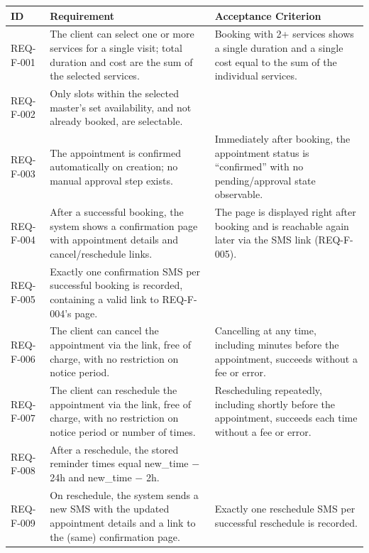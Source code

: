 \documentclass[11pt,a4paper]{article}
\begin{document}
\begin{longtable}{L{1.9cm}L{6.4cm}L{6.2cm}}
\toprule
ID & Requirement & Acceptance Criterion \\
\midrule
\endhead

REQ-F-001 &
The client can select one or more services for a single visit; total
duration and cost are the sum of the selected services. &
Booking with 2+ services shows a single duration and a single cost equal
to the sum of the individual services. \\

REQ-F-002 &
Only slots within the selected master's set availability, and not already
booked, are selectable. \\

REQ-F-003 &
The appointment is confirmed automatically on creation; no manual
approval step exists. &
Immediately after booking, the appointment status is ``confirmed'' with
no pending/approval state observable.  \\

REQ-F-004 &
After a successful booking, the system shows a confirmation page with
appointment details and cancel/reschedule links. &
The page is displayed right after booking and is reachable again later
via the SMS link (REQ-F-005). \\

REQ-F-005 &
Exactly one confirmation SMS per successful booking is recorded,
containing a valid link to REQ-F-004's page. \\

REQ-F-006 &
The client can cancel the appointment via the link, free of charge, with
no restriction on notice period. &
Cancelling at any time, including minutes before the appointment, succeeds
without a fee or error.  \\

REQ-F-007 &
The client can reschedule the appointment via the link, free of charge,
with no restriction on notice period or number of times. &
Rescheduling repeatedly, including shortly before the appointment,
succeeds each time without a fee or error. \\

REQ-F-008 &
After a reschedule, the stored reminder times equal
new\_time $-$ 24h and new\_time $-$ 2h. \\

REQ-F-009 &
On reschedule, the system sends a new SMS with the updated appointment
details and a link to the (same) confirmation page. &
Exactly one reschedule SMS per successful reschedule is recorded.  \\


\end{longtable}
\end{document}
